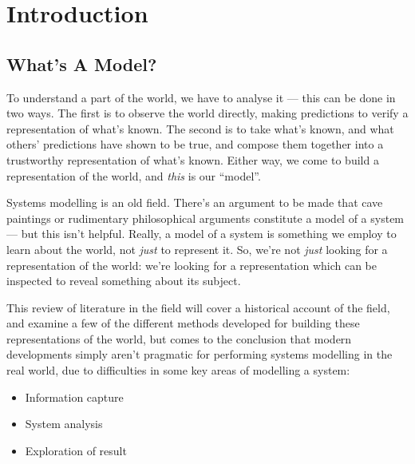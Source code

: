\section{Introduction}

\subsection{What's A Model?}
To understand a part of the world, we have to analyse it --- this can be done in
two ways. The first is to observe the world directly, making predictions to
verify a representation of what's known. The second is to take what's known, and
what others' predictions have shown to be true, and compose them together into a
trustworthy representation of what's known. Either way, we come to build a
representation of the world, and \emph{this} is our ``model''. \par

Systems modelling is an old field. There's an argument to be made that cave
paintings or rudimentary philosophical arguments constitute a model of a system
--- but this isn't helpful. Really, a model of a system is something we employ
to learn about the world, not \emph{just} to represent it. So, we're not \emph{just}
looking for a representation of the world: we're looking for a representation
which can be inspected to reveal something about its subject.\par

This review of literature in the field will cover a historical account of the
field, and examine a few of the different methods developed for building these
representations of the world, but comes to the conclusion that modern
developments simply aren't pragmatic for performing systems modelling in the
real world, due to difficulties in some key areas of modelling a system:

\begin{itemize}
\item Information capture
\item System analysis
\item Exploration of result
\end{itemize}



